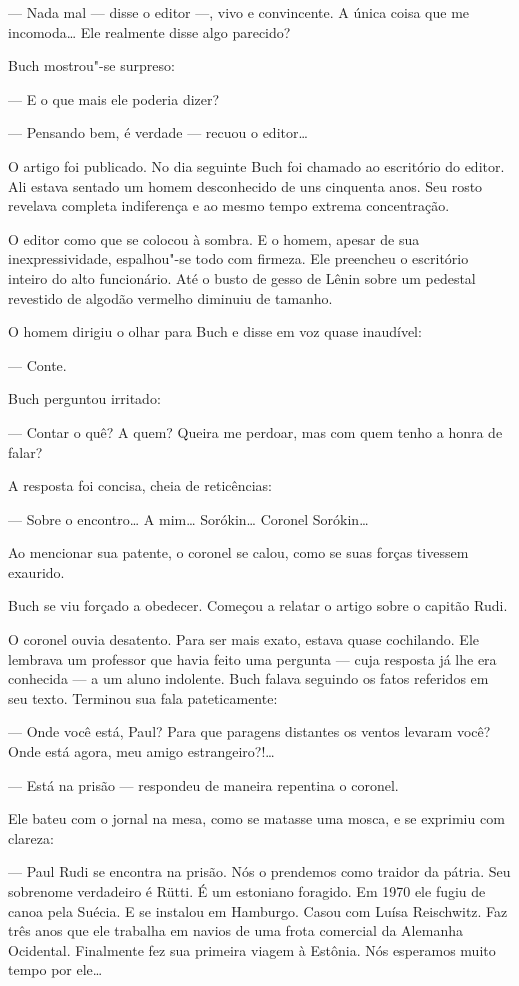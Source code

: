 --- Nada mal --- disse o editor ---, vivo e convincente. A única coisa
que me incomoda\ldots{} Ele realmente disse algo parecido?

Buch mostrou"-se surpreso:

--- E o que mais ele poderia dizer?

--- Pensando bem, é verdade --- recuou o editor\ldots{}

O artigo foi publicado. No dia seguinte Buch foi chamado ao escritório
do editor. Ali estava sentado um homem desconhecido de uns cinquenta
anos. Seu rosto revelava completa indiferença e ao mesmo tempo extrema
concentração.

O editor como que se colocou à sombra. E o homem, apesar de sua
inexpressividade, espalhou"-se todo com firmeza. Ele preencheu o
escritório inteiro do alto funcionário. Até o busto de gesso de Lênin
sobre um pedestal revestido de algodão vermelho diminuiu de tamanho.

O homem dirigiu o olhar para Buch e disse em voz quase inaudível:

--- Conte.

Buch perguntou irritado:

--- Contar o quê? A quem? Queira me perdoar, mas com quem tenho a honra
de falar?

A resposta foi concisa, cheia de reticências:

--- Sobre o encontro\ldots{} A mim\ldots{} Sorókin\ldots{} Coronel Sorókin\ldots{}

Ao mencionar sua patente, o coronel se calou, como se suas forças
tivessem exaurido.

Buch se viu forçado a obedecer. Começou a relatar o artigo sobre o
capitão Rudi.

O coronel ouvia desatento. Para ser mais exato, estava quase cochilando.
Ele lembrava um professor que havia feito uma pergunta --- cuja resposta
já lhe era conhecida --- a um aluno indolente. Buch falava seguindo os
fatos referidos em seu texto. Terminou sua fala pateticamente:

--- Onde você está, Paul? Para que paragens distantes os ventos levaram
você? Onde está agora, meu amigo estrangeiro?!\ldots{}

--- Está na prisão --- respondeu de maneira repentina o coronel.

Ele bateu com o jornal na mesa, como se matasse uma mosca, e se exprimiu
com clareza:

--- Paul Rudi se encontra na prisão. Nós o prendemos como traidor da
pátria. Seu sobrenome verdadeiro é Rütti. É um estoniano foragido. Em
1970 ele fugiu de canoa pela Suécia. E se instalou em Hamburgo. Casou
com Luísa Reischwitz. Faz três anos que ele trabalha em navios de uma
frota comercial da Alemanha Ocidental. Finalmente fez sua primeira
viagem à Estônia. Nós esperamos muito tempo por ele\ldots{}

